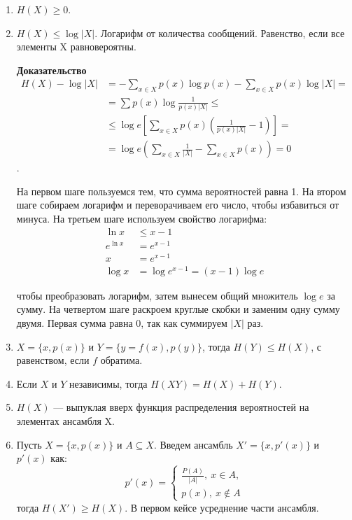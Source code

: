 \begin{enumerate}
    \item $H(X) \geq 0$.

    \item $H(X) \leq \log |X|$. Логарифм от количества сообщений. Равенство,
        если все элементы X равновероятны.

    \textbf{Доказательство}
    \begin{align*}
        H(X) - \log |X| &=
        - \sum_{x \in X} p(x) \log p(x) - \sum_{x \in X} p(x) \log |X| =
        \\
        &= \sum p(x) \log \frac{1}{p(x) |X|} \leq
        \\
        &\leq \log e \left[\sum_{x \in X} p(x) \left(
            \frac{1}{p(x)|X|} - 1 \right) \right] =
        \\
        &= \log e \left( \sum_{x \in X} \frac{1}{|X|} -
            \sum_{x \in X} p(x) \right) = 0
    \end{align*}.

    На первом шаге пользуемся тем, что сумма вероятностей равна 1. На втором
    шаге собираем логарифм и переворачиваем его число, чтобы избавиться от
    минуса. На третьем шаге используем свойство логарифма:
    \begin{align*}
        \ln x &\leq x - 1
        \\
        e^{\ln x} &= e^{x -1}
        \\
        x &= e^{x - 1}
        \\
        \log x &= \log e^{x - 1} = (x - 1) \log e
    \end{align*}


    чтобы преобразовать логарифм, затем вынесем общий множитель $\log e$ за
    сумму. На четвертом шаге раскроем круглые скобки и заменим одну сумму
    двумя. Первая сумма равна 0, так как суммируем $|X|$ раз.

    \item $X = \{ x, p(x) \}$ и $Y = \{y = f(x), p(y) \}$, тогда $H(Y) \leq
        H(X)$, с равенством, если $f$ обратима.

    \item Если $X$ и $Y$ независимы, тогда $H(XY) = H(X) + H(Y)$.

    \item $H(X)$ --- выпуклая вверх функция распределения вероятностей на
        элементах ансамбля X. 

    \item Пусть $X = \{ x, p(x) \}$ и $A \subseteq X$. Введем ансамбль $X' = \{
        x, p'(x) \}$ и $p'(x)$ как:
        \[
            p'(x) =
            \begin{cases}
                \frac{P(A)}{|A|},\ x \in A,\\
                p(x),\ x \not\in A
            \end{cases}
        \]
        тогда $H(X') \geq H(X)$. В первом кейсе усреднение части ансамбля.


\end{enumerate}
